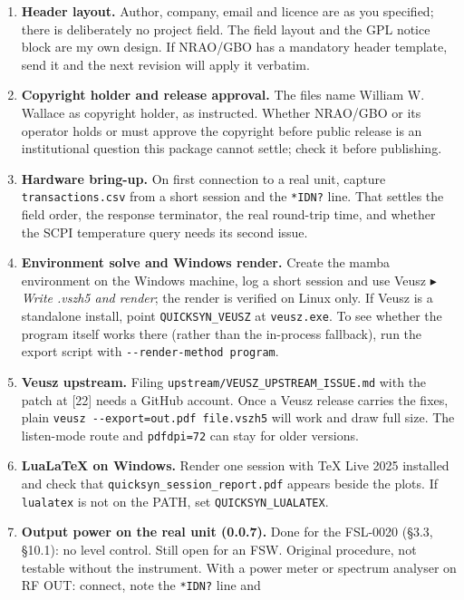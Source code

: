 \documentclass[
\directlua{luaotfload.add_fallback("qsfallback", {"DejaVu Sans:mode=harf;", "DejaVu Sans Mono:mode=harf;", "DejaVu Math TeX Gyre:mode=harf;"})}
  10pt,
  letterpaper,
]{article}
\begin{document}
\begin{enumerate}
\def\labelenumi{\arabic{enumi}.}
\item
  \textbf{Header layout.} Author, company, email and licence are as you
  specified; there is deliberately no project field. The field layout
  and the GPL notice block are my own design. If NRAO/GBO has a
  mandatory header template, send it and the next revision will apply it
  verbatim.
\item
  \textbf{Copyright holder and release approval.} The files name William
  W. Wallace as copyright holder, as instructed. Whether NRAO/GBO or its
  operator holds or must approve the copyright before public release is
  an institutional question this package cannot settle; check it before
  publishing.
\item
  \textbf{Hardware bring-up.} On first connection to a real unit,
  capture \texttt{transactions.csv} from a short session and the
  \texttt{*IDN?} line. That settles the field order, the response
  terminator, the real round-trip time, and whether the SCPI temperature
  query needs its second issue.
\item
  \textbf{Environment solve and Windows render.} Create the mamba
  environment on the Windows machine, log a short session and use Veusz
  ▸ \emph{Write .vszh5 and render}; the render is verified on Linux
  only. If Veusz is a standalone install, point \texttt{QUICKSYN\_VEUSZ}
  at \texttt{veusz.exe}. To see whether the program itself works there
  (rather than the in-process fallback), run the export script with
  \texttt{-\/-render-method\ program}.
\item
  \textbf{Veusz upstream.} Filing
  \texttt{upstream/VEUSZ\_UPSTREAM\_ISSUE.md} with the patch at {[}22{]}
  needs a GitHub account. Once a Veusz release carries the fixes, plain
  \texttt{veusz\ -\/-export=out.pdf\ file.vszh5} will work and draw full
  size. The listen-mode route and \texttt{pdfdpi=72} can stay for older
  versions.
\item
  \textbf{LuaLaTeX on Windows.} Render one session with TeX Live 2025
  installed and check that \texttt{quicksyn\_session\_report.pdf}
  appears beside the plots. If \texttt{lualatex} is not on the PATH, set
  \texttt{QUICKSYN\_LUALATEX}.
\item
  \textbf{Output power on the real unit (0.0.7).} Done for the FSL-0020
  (§3.3, §10.1): no level control. Still open for an FSW. Original
  procedure, not testable without the instrument. With a power meter or
  spectrum analyser on RF OUT: connect, note the \texttt{*IDN?} line and

\end{enumerate}
\end{document}
